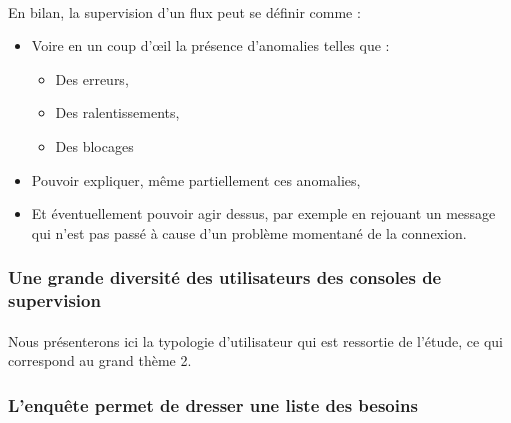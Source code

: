 			\paragraph{}
			En bilan, la supervision d’un flux peut se définir comme :
			\begin{itemize}
			  \item Voire en un coup d’œil la présence d’anomalies telles que :
			  	\begin{itemize}
			  	  \item Des erreurs,
			  	  \item Des ralentissements,
			  	  \item Des blocages
		  	    \end{itemize}
			  \item Pouvoir expliquer, même partiellement ces anomalies,
			  \item Et éventuellement pouvoir agir dessus, par exemple en rejouant un
			  message qui n’est pas passé à cause d’un problème momentané de la connexion.
			\end{itemize}
			
		\subsubsection{Une grande diversité des utilisateurs des consoles de
		supervision}
			\paragraph{}%
			Nous présenterons ici la typologie d'utilisateur qui est ressortie de
			l'étude, ce qui correspond au grand thème 2.
			
			\paragraph{}%
			
		\subsubsection{L'enquête permet de dresser une liste des besoins}
			\paragraph{}%
			
			\paragraph{}%
			
